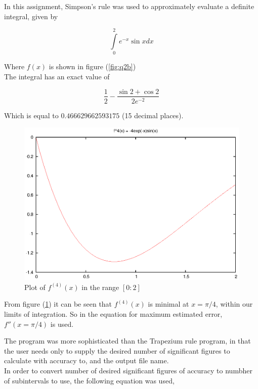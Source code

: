 \documentclass[pdf,color]{UoBnote}
\begin{document}
			In this assignment, Simpson's rule was used to approximately evaluate a definite integral, given by
				
				\begin{equation}
				\int\limits_0^2 e^{-x}\sin{x} dx	
				\end{equation}
				
				Where $f(x)$ is shown in figure (\ref{fig:q2b})\\
				
				The integral has an exact value of
				
				\begin{equation}
				\frac{1}{2} - \frac{\sin{2}+\cos{2}}{2e^{-2}}
				\end{equation}
				
				Which is equal to $0.466629662593175$ (15 decimal places).\\				
				\begin{figure}[H]
					\centering
						\includegraphics{figures/q2-f4x-simps.eps}
					\caption{Plot of $f^{\left(4\right)}(x)$ in the range $[0:2]$}
					\label{fig:q2-f4x-simps}
				\end{figure}				
				
				From figure (\ref{fig:q2-f4x-simps}) it can be seen that $f^{(4)}(x)$ is minimal at $x=\pi / 4$, within our limits of integration. So in the equation for maximum estimated error, $f''(x=\pi / 4)$ is used.
				
				The program was more sophisticated than the Trapezium rule program, in that the user needs only to supply the desired number of significant figures to calculate with accuracy to, and the output file name.\\
				In order to convert number of desired significant figures of accuracy to numbher of subintervals to use, the following equation was used,
				
\end{document}
